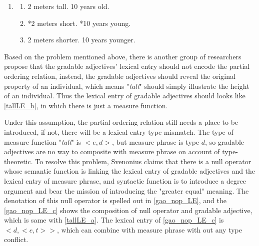 \documentclass{ctexart}
\let \cite \parencite
\begin{document}
\begin{enumerate}[resume]

    \item \label{old_school_def_problem}
    
    \begin{enumerate}[ref=(\arabic{enumi}\alph*)]
        
        \item 2 meters tall. 10 years old.
        \item *2 meters short. *10 years young.
        \item \label{old_school_def_problem_correct} 2 meters shorter. 10 years younger.

    \end{enumerate}

\end{enumerate}

Based on the problem mentioned above, there is another group of researchers propose that the gradable adjectives' lexical entry should not encode the partial ordering relation, instead, the gradable adjectives should reveal the original property of an individual, which means "\textit{tall}" should simply illustrate the height of an individual. Thus the lexical entry of gradable adjectives should looks like \ref{tallLE_b}, in which there is just a measure function. 

Under this assumption, the partial ordering relation still needs a place to be introduced, if not, there will be a lexical entry type mismatch. The type of measure function "\textit{tall}" is $<e,d>$, but measure phrase is type $d$, so gradable adjectives are no way to composite with measure phrase on account of type-theoretic. To resolve this problem, Svenonius\cite{svenonius2006} claims that there is a null operator whose semantic function is linking the lexical entry of gradable adjectives and the lexical entry of measure phrase, and syntactic function is to introduce a degree argument and bear the mission of introducing the "greater equal" meaning. The denotation of this null operator is spelled out in \ref{gao_nop_LE}, and the \ref{gao_nop_LE_c} shows the composition of null operator and gradable adjective, which is same with \ref{tallLE_a}. The lexical entry of \ref{gao_nop_LE_c} is $<d,<e,t>>$, which can combine with measure phrase with out any type conflict.
\end{document}
